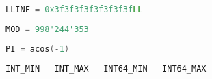 \begin{lstlisting}[language=C++]
LLINF = 0x3f3f3f3f3f3f3f3fLL
\end{lstlisting}

\begin{lstlisting}[language=C++]
MOD = 998'244'353
\end{lstlisting}

\begin{lstlisting}[language=C++]
PI = acos(-1)
\end{lstlisting}

\begin{lstlisting}[language=C++]
  INT_MIN   INT_MAX   INT64_MIN   INT64_MAX
\end{lstlisting}